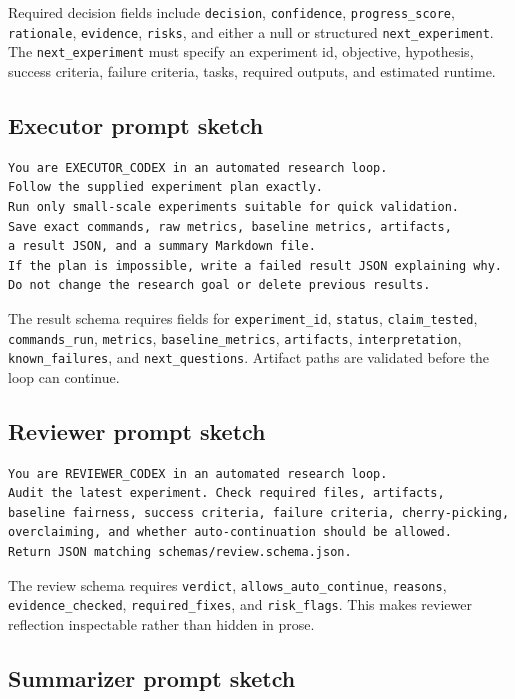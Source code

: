 \documentclass{article}
\begin{document}
Required decision fields include \texttt{decision}, \texttt{confidence}, \texttt{progress\_score}, \texttt{rationale}, \texttt{evidence}, \texttt{risks}, and either a null or structured \texttt{next\_experiment}. The \texttt{next\_experiment} must specify an experiment id, objective, hypothesis, success criteria, failure criteria, tasks, required outputs, and estimated runtime.

\subsection{Executor prompt sketch}

\begin{verbatim}
You are EXECUTOR_CODEX in an automated research loop.
Follow the supplied experiment plan exactly.
Run only small-scale experiments suitable for quick validation.
Save exact commands, raw metrics, baseline metrics, artifacts,
a result JSON, and a summary Markdown file.
If the plan is impossible, write a failed result JSON explaining why.
Do not change the research goal or delete previous results.
\end{verbatim}

The result schema requires fields for \texttt{experiment\_id}, \texttt{status}, \texttt{claim\_tested}, \texttt{commands\_run}, \texttt{metrics}, \texttt{baseline\_metrics}, \texttt{artifacts}, \texttt{interpretation}, \texttt{known\_failures}, and \texttt{next\_questions}. Artifact paths are validated before the loop can continue.

\subsection{Reviewer prompt sketch}

\begin{verbatim}
You are REVIEWER_CODEX in an automated research loop.
Audit the latest experiment. Check required files, artifacts,
baseline fairness, success criteria, failure criteria, cherry-picking,
overclaiming, and whether auto-continuation should be allowed.
Return JSON matching schemas/review.schema.json.
\end{verbatim}

The review schema requires \texttt{verdict}, \texttt{allows\_auto\_continue}, \texttt{reasons}, \texttt{evidence\_checked}, \texttt{required\_fixes}, and \texttt{risk\_flags}. This makes reviewer reflection inspectable rather than hidden in prose.

\subsection{Summarizer prompt sketch}
\end{document}
